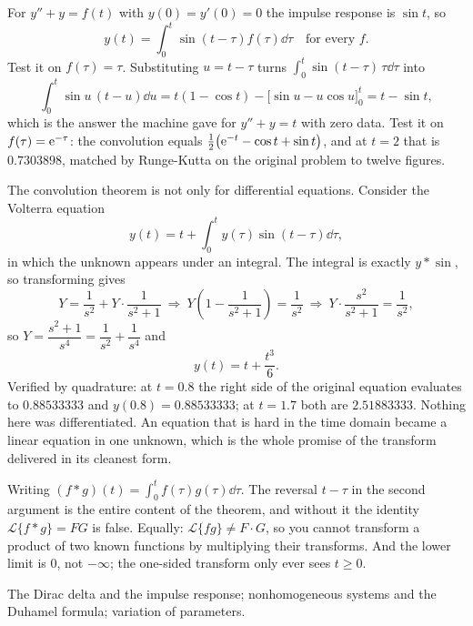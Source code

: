 \begin{worked}
For $y''+y=f(t)$ with $y(0)=y'(0)=0$ the impulse response is $\sin t$, so
\[y(t)=\int_0^{t}\sin(t-\tau)f(\tau)\dd\tau\quad\text{for every }f.\]
Test it on $f(\tau)=\tau$. Substituting $u=t-\tau$ turns $\int_0^{t}\sin(t-\tau)\,\tau\dd\tau$ into
\[\int_0^{t}\sin u\,(t-u)\dd u=t(1-\cos t)-\bigl[\sin u-u\cos u\bigr]_0^{t}=t-\sin t,\]
which is the answer the machine gave for $y''+y=t$ with zero data. Test it on $f(\tau)=\mathrm{e}^{-\tau}$: the convolution equals $\tfrac12\bigl(\mathrm{e}^{-t}-\cos t+\sin t\bigr)$, and at $t=2$ that is $0.7303898$, matched by Runge-Kutta on the original problem to twelve figures.
\end{worked}

\begin{worked}
The convolution theorem is not only for differential equations. Consider the Volterra equation
\[y(t)=t+\int_0^{t}y(\tau)\sin(t-\tau)\dd\tau,\]
in which the unknown appears under an integral. The integral is exactly $y*\sin$, so transforming gives
\[Y=\frac1{s^{2}}+Y\cdot\frac{1}{s^{2}+1}\ \Longrightarrow\ Y\left(1-\frac1{s^{2}+1}\right)=\frac1{s^{2}}\ \Longrightarrow\ Y\cdot\frac{s^{2}}{s^{2}+1}=\frac1{s^{2}},\]
so $Y=\dfrac{s^{2}+1}{s^{4}}=\dfrac1{s^{2}}+\dfrac1{s^{4}}$ and
\[y(t)=t+\frac{t^{3}}{6}.\]
Verified by quadrature: at $t=0.8$ the right side of the original equation evaluates to $0.88533333$ and $y(0.8)=0.88533333$; at $t=1.7$ both are $2.51883333$. Nothing here was differentiated. An equation that is hard in the time domain became a linear equation in one unknown, which is the whole promise of the transform delivered in its cleanest form.
\end{worked}

\begin{trap}
Writing $(f*g)(t)=\int_0^{t}f(\tau)g(\tau)\dd\tau$. The reversal $t-\tau$ in the second argument is the entire content of the theorem, and without it the identity $\mathcal{L}\{f*g\}=FG$ is false. Equally: $\mathcal{L}\{fg\}\ne F\cdot G$, so you cannot transform a product of two known functions by multiplying their transforms. And the lower limit is $0$, not $-\infty$; the one-sided transform only ever sees $t\ge0$.
\end{trap}

\begin{seealsob}The Dirac delta and the impulse response; nonhomogeneous systems and the Duhamel formula; variation of parameters.\end{seealsob}

